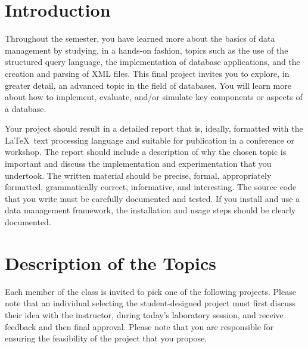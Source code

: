 


\usepackage[compact]{titlesec}



\section*{Introduction}

Throughout the semester, you have learned more about the basics of data management by studying, in a hands-on fashion,
topics such as the use of the structured query language, the implementation of database applications, and the creation
and parsing of XML files.  This final project invites you to explore, in greater detail, an advanced topic in the field
of databases. You will learn more about how to implement, evaluate, and/or simulate key components or aspects of a
database. 

Your project should result in a detailed report that is, ideally, formatted with the \LaTeX\ text processing language
and suitable for publication in a conference or workshop.  The report should include a description of why the chosen
topic is important and discuss the implementation and experimentation that you undertook.  The written material should
be precise, formal, appropriately formatted, grammatically correct, informative, and interesting.  The source code that
you write must be carefully documented and tested.  If you install and use a data management framework, the installation
and usage steps should be clearly documented. 

\section*{Description of the Topics}

Each member of the class is invited to pick one of the following projects.  Please note that an individual selecting the
student-designed project must first discuss their idea with the instructor, during today's laboratory session, and
receive feedback and then final approval.  Please note that you are responsible for ensuring the feasibility of the
project that you propose.

